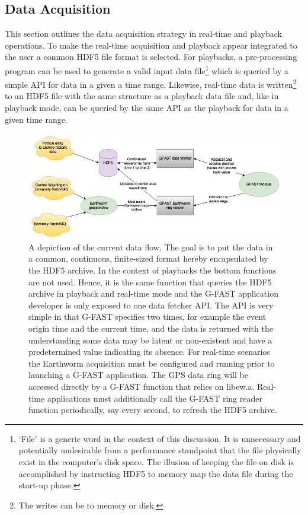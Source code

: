 \documentclass[12pt]{article}
\begin{document}
\subsection{Data Acquisition}
This section outlines the data acquisition strategy in real-time and playback operations.
To make the real-time acquisition and playback appear integrated to the user a common
HDF5 file format is selected.  For playbacks, a pre-processing program can be used to generate 
a valid input data 
file\footnote{`File' is a generic word in the context of this discussion.  
It is unnecessary and potentially undesirable from a performance standpoint that
the file physically exist in the computer's disk space.  The illusion of keeping 
the file on disk is accomplished by instructing HDF5 to memory map the data 
file during the start-up phase.}
which is queried by a simple API for data in a given a time range.  
Likewise, real-time data is  
written\footnote{The writes can be to memory or disk.}
to an HDF5 file with the same structure as a playback data file and, like in playback mode,
can be queried by the same API as the playback for data in a given time range.

\begin{center}
\begin{figure}
\includegraphics[scale=0.55]{Figs/gfast_dataIO.jpg}
\caption{A depiction of the current data flow.  The goal is to put the data in a common, 
continuous, finite-sized format hereby encapsulated by the HDF5 archive.  
In the context of playbacks the bottom functions are not used.
Hence, it is the same function that queries the HDF5 archive in playback and 
real-time mode and the G-FAST application developer is only exposed to one data 
fetcher API.  The API is very simple in that G-FAST specifies two times, for example 
the event origin time and the current time, and the data is returned with the understanding
some data may be latent or non-existent and have a predetermined value indicating its absence. 
For real-time scenarios the Earthworm acquisition must be configured 
and running prior to launching a G-FAST application.   The GPS data ring will be accessed
directly by a G-FAST function that relies on libew.a.  Real-time applications 
must additionally call the G-FAST ring reader function periodically, say every second, 
to refresh the HDF5 archive.
}\label{F:gfastDataIO}
\end{figure}
\end{center}
\end{document}
